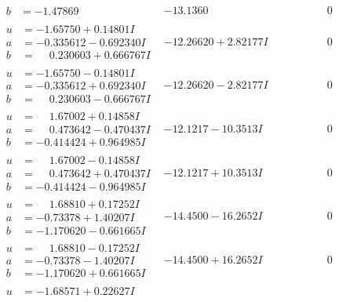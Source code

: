 \documentclass[1p]{elsarticle_modified}
\theoremstyle{definition}
\begin{document}
$$\begin{array}{c|c|c}
\begin{aligned}
b &= -1.47869\phantom{ +0.000000I}\end{aligned}
 & -13.1360\phantom{ +0.000000I} & \phantom{-0.000000 } 0 \\ \hline\begin{aligned}
u &= -1.65750 + 0.14801 I \\
a &= -0.335612 - 0.692340 I \\
b &= \phantom{-}0.230603 + 0.666767 I\end{aligned}
 & -12.26620 + 2.82177 I & \phantom{-0.000000 } 0 \\ \hline\begin{aligned}
u &= -1.65750 - 0.14801 I \\
a &= -0.335612 + 0.692340 I \\
b &= \phantom{-}0.230603 - 0.666767 I\end{aligned}
 & -12.26620 - 2.82177 I & \phantom{-0.000000 } 0 \\ \hline\begin{aligned}
u &= \phantom{-}1.67002 + 0.14858 I \\
a &= \phantom{-}0.473642 - 0.470437 I \\
b &= -0.414424 + 0.964985 I\end{aligned}
 & -12.1217 - 10.3513 I & \phantom{-0.000000 } 0 \\ \hline\begin{aligned}
u &= \phantom{-}1.67002 - 0.14858 I \\
a &= \phantom{-}0.473642 + 0.470437 I \\
b &= -0.414424 - 0.964985 I\end{aligned}
 & -12.1217 + 10.3513 I & \phantom{-0.000000 } 0 \\ \hline\begin{aligned}
u &= \phantom{-}1.68810 + 0.17252 I \\
a &= -0.73378 + 1.40207 I \\
b &= -1.170620 - 0.661665 I\end{aligned}
 & -14.4500 - 16.2652 I & \phantom{-0.000000 } 0 \\ \hline\begin{aligned}
u &= \phantom{-}1.68810 - 0.17252 I \\
a &= -0.73378 - 1.40207 I \\
b &= -1.170620 + 0.661665 I\end{aligned}
 & -14.4500 + 16.2652 I & \phantom{-0.000000 } 0 \\ \hline\begin{aligned}
u &= -1.68571 + 0.22627 I \\

\end{aligned}
\end{array}$$
\end{document}
